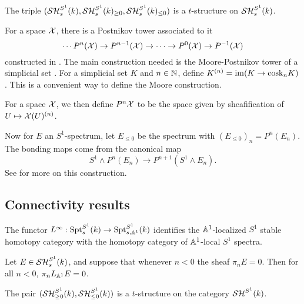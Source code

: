 \documentclass{amsart}%
\newcommand{\cosk}{\mathrm{cosk}}
\begin{document}
\begin{theorem}
  The triple
  $(\mathcal{SH}_s^{S^1}(k), \mathcal{SH}_s^{S^1}(k)_{\geq 0}, \mathcal{SH}_s^{S^1}(k)_{\leq 0})$
  is a $t$-structure on $\mathcal{SH}_s^{S^1}(k)$. 
\end{theorem}


\begin{remark}
  For a space $\mathcal{X}$, there is a Postnikov tower associated to it
  \begin{equation*}
    \cdots P^n(\mathcal{X})\to P^{n-1}(\mathcal{X}) \to \cdots \to P^{0}(\mathcal{X}) \to P^{-1}(\mathcal{X})
  \end{equation*}
  constructed in \cite[p. 57]{MV99}. The main construction needed is the
  Moore-Postnikov tower of a simplicial set \cite[VI.3.4]{GJ91}. For a
  simplicial set $K$ and $n\in\mathbb{N}$, define
  $K^{(n)} = \im ( K \to \cosk_nK)$. This is a convenient way to
  define the Moore construction. 

  For a space $\mathcal{X}$, we then define $P^{n}\mathcal{X}$ to be the space
  given by sheafification of $U \mapsto \mathcal{X}(U)^{(n)}$.

  Now for $E$ an $S^1$-spectrum, let $E_{\leq 0}$ be the spectrum with
  $(E_{\leq 0})_n = P^n(E_n)$. The bonding maps come from the
  canonical map
  \begin{equation*}
    S^1 \wedge P^n(E_n) \to P^{n+1}(S^1 \wedge E_n).
  \end{equation*}
  See \cite[Lemma 3.2.1]{Mor05} for more on this construction.
\end{remark}

\subsection{Connectivity results}

\begin{proposition}\cite[Lemma4.2.4]{Mor03}
  The functor
  $L^{\infty} : \mathrm{Spt}^{S^1}_s(k) \to \mathrm{Spt}^{S^1}_{s,\mathbb{A}^1}(k)$
  identifies the $\mathbb{A}^1$-localized $S^1$ stable homotopy category
  with the homotopy category of $\mathbb{A}^1$-local $S^1$ spectra.
\end{proposition}

\begin{theorem}
  Let $E \in \mathcal{SH}_s^{S^1}(k)$, and suppose that whenever $n < 0$ the
  sheaf $\pi_n E = 0$. Then for all $n<0$, $\pi_n L_{\mathbb{A}^1}E = 0$.
\end{theorem}

\begin{theorem}
  The pair $(\mathcal{SH}_{\geq 0}^{S^1}(k), \mathcal{SH}_{\leq 0}^{S^1}(k))$ is a
  $t$-structure on the category $\mathcal{SH}^{S^1}(k)$. 
\end{theorem}
\end{document}
